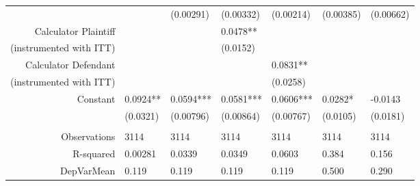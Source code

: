 \begin{tabular}{rrrrrrr}
      & \multicolumn{1}{l}{} & \multicolumn{1}{l}{(0.00291)} & \multicolumn{1}{l}{(0.00332)} & \multicolumn{1}{l}{(0.00214)} & \multicolumn{1}{l}{(0.00385)} & \multicolumn{1}{l}{(0.00662)} \\
Calculator Plaintiff & \multicolumn{1}{l}{} & \multicolumn{1}{l}{} & \multicolumn{1}{l}{0.0478**} & \multicolumn{1}{l}{} & \multicolumn{1}{l}{} & \multicolumn{1}{l}{} \\
(instrumented with ITT) & \multicolumn{1}{l}{} & \multicolumn{1}{l}{} & \multicolumn{1}{l}{(0.0152)} & \multicolumn{1}{l}{} & \multicolumn{1}{l}{} & \multicolumn{1}{l}{} \\
Calculator Defendant & \multicolumn{1}{l}{} & \multicolumn{1}{l}{} & \multicolumn{1}{l}{} & \multicolumn{1}{l}{0.0831**} & \multicolumn{1}{l}{} & \multicolumn{1}{l}{} \\
(instrumented with ITT) & \multicolumn{1}{l}{} & \multicolumn{1}{l}{} & \multicolumn{1}{l}{} & \multicolumn{1}{l}{(0.0258)} & \multicolumn{1}{l}{} & \multicolumn{1}{l}{} \\
Constant  & \multicolumn{1}{l}{0.0924**} & \multicolumn{1}{l}{0.0594***} & \multicolumn{1}{l}{0.0581***} & \multicolumn{1}{l}{0.0606***} & \multicolumn{1}{l}{0.0282*} & \multicolumn{1}{l}{-0.0143} \\
      & \multicolumn{1}{l}{(0.0321)} & \multicolumn{1}{l}{(0.00796)} & \multicolumn{1}{l}{(0.00864)} & \multicolumn{1}{l}{(0.00767)} & \multicolumn{1}{l}{(0.0105)} & \multicolumn{1}{l}{(0.0181)} \\
      & \multicolumn{1}{l}{} & \multicolumn{1}{l}{} & \multicolumn{1}{l}{} & \multicolumn{1}{l}{} & \multicolumn{1}{l}{} & \multicolumn{1}{l}{} \\
      \midrule
Observations & \multicolumn{1}{l}{3114} & \multicolumn{1}{l}{3114} & \multicolumn{1}{l}{3114} & \multicolumn{1}{l}{3114} & \multicolumn{1}{l}{3114} & \multicolumn{1}{l}{3114} \\
R-squared & \multicolumn{1}{l}{0.00281} & \multicolumn{1}{l}{0.0339} & \multicolumn{1}{l}{0.0349} & \multicolumn{1}{l}{0.0603} & \multicolumn{1}{l}{0.384} & \multicolumn{1}{l}{0.156} \\
DepVarMean & \multicolumn{1}{l}{0.119} & \multicolumn{1}{l}{0.119} & \multicolumn{1}{l}{0.119} & \multicolumn{1}{l}{0.119} & \multicolumn{1}{l}{0.500} & \multicolumn{1}{l}{0.290} \\
\bottomrule
\end{tabular}%
